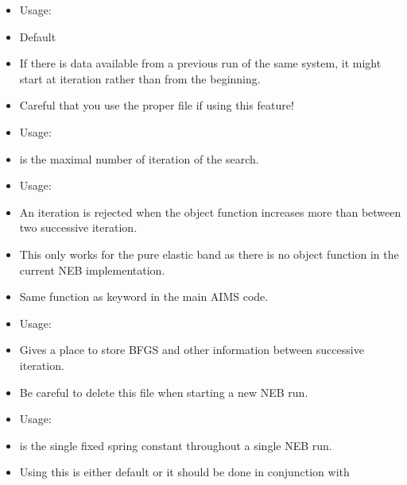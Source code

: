 {\begin{itemize}
    \item Usage:  
    \item Default  
    \item If there is data available from a previous run of the same system,
      it might start at iteration  rather than from the beginning.
    \item Careful that you use the proper  file if using this feature!
  \end{itemize}}

{\begin{itemize}
    \item Usage:  
    \item {} is the maximal number of iteration of the search.
  \end{itemize}}

{\begin{itemize}
  \item Usage:  
  \item An iteration is rejected when the object function increases
    more than  between two successive iteration. 
  \item This only works for the pure elastic band 
    as there is no object function in the current NEB implementation.
  \item Same function as keyword  in the main AIMS code.
\end{itemize}}

{\begin{itemize}
    \item Usage:  
    \item Gives a place to store BFGS and other information between successive iteration. 
    \item Be careful to delete this file when starting a new NEB run.
\end{itemize} }

{\begin{itemize}
    \item Usage:  
    \item {} is the single fixed spring constant throughout a single NEB run.
    \item Using this is either default or it should be done in conjunction with \\
       
  \end{itemize}}


